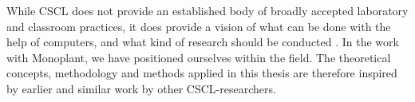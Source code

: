 While CSCL does not provide an established body of broadly accepted laboratory and classroom practices, it does provide a vision of what can be done with the help of computers, and what kind of research should be conducted \citep{stahl2006computer}. In the work with Monoplant, we have positioned ourselves within the field. The theoretical concepts, methodology and methods applied in this thesis are therefore inspired by earlier and similar work by other CSCL-researchers.







